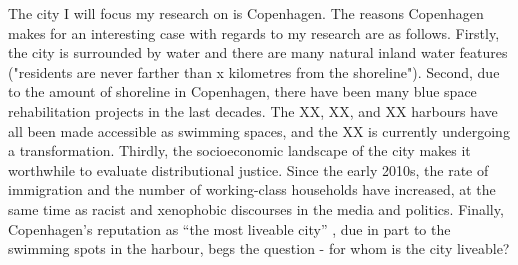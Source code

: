 \documentclass{article}
\begin{document}
The city I will focus my research on is Copenhagen.
The reasons Copenhagen makes for an interesting case with regards to my research are as follows. Firstly, the city is surrounded by water and there are many natural inland water features ("residents are never farther than x kilometres from the shoreline"). 
Second, due to the amount of shoreline in Copenhagen, there have been many blue space rehabilitation projects in the last decades. The XX, XX, and XX harbours have all been made accessible as swimming spaces, and the XX is currently undergoing a transformation.
Thirdly, the socioeconomic landscape of the city makes it worthwhile to evaluate distributional justice. Since the early 2010s, the rate of immigration and the number of working-class households have increased, at the same time as racist and xenophobic discourses in the media and politics. 
Finally, Copenhagen's reputation as ``the most liveable city'' \parencite{visitdenmark_2021}, due in part to the swimming spots in the harbour, begs the question - for whom is the city liveable?



\printbibliography
\end{document}
